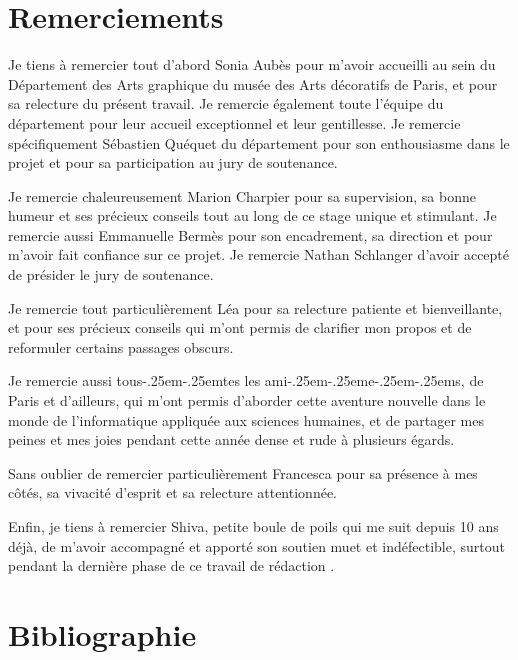 \documentclass[12pt,twoside]{book}
\newcommand{\wokisme}{\kern-.25em\textperiodcentered\kern-.25em} %
\begin{document}
	\chapter{Remerciements}
    
Je tiens à remercier tout d'abord Sonia Aubès pour m'avoir accueilli au sein du Département des Arts graphique du musée des Arts décoratifs de Paris, et pour sa relecture du présent travail. Je remercie également toute l'équipe du département pour leur accueil exceptionnel et leur gentillesse. Je remercie spécifiquement Sébastien Quéquet du département pour son enthousiasme dans le projet et pour sa participation au jury de soutenance.

Je remercie chaleureusement Marion Charpier pour sa supervision, sa bonne humeur et ses précieux conseils tout au long de ce stage unique et stimulant. Je remercie aussi Emmanuelle Bermès pour son encadrement, sa direction et pour m'avoir fait confiance sur ce projet. Je remercie Nathan Schlanger d'avoir accepté de présider le jury de soutenance.

Je remercie tout particulièrement Léa pour sa relecture patiente et bienveillante, et pour ses précieux conseils qui m'ont permis de clarifier mon propos et de reformuler certains passages obscurs. 

Je remercie aussi tous\wokisme tes les ami\wokisme e\wokisme s, de Paris et d'ailleurs, qui m'ont permis d'aborder cette aventure nouvelle dans le monde de l'informatique appliquée aux sciences humaines, et de partager mes peines et mes joies pendant cette année dense et rude à plusieurs égards. 

Sans oublier de remercier particulièrement Francesca pour sa présence à mes côtés, sa vivacité d'esprit et sa relecture attentionnée.

Enfin, je tiens à remercier Shiva, petite boule de poils qui me suit depuis 10 ans déjà, de m'avoir accompagné et apporté son soutien muet et indéfectible, surtout pendant la dernière phase de ce travail de rédaction .

        
\nocite{*}
\chapter{Bibliographie}
\section*{}
\end{document}
